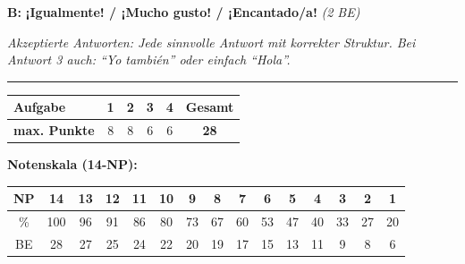 \documentclass[11pt, a4paper]{article}
\newcommand{\lsg}[1]{\textcolor{loesung}{\textbf{#1}}}
\begin{document}
\vspace{0.4em}
\noindent
\textbf{B:} \lsg{¡Igualmente! / ¡Mucho gusto! / ¡Encantado/a!} \hfill \textit{(2 BE)}

\vspace{5pt}
\textit{Akzeptierte Antworten: Jede sinnvolle Antwort mit korrekter Struktur. Bei Antwort 3 auch: ``Yo también'' oder einfach ``Hola''.}


\vspace{20pt}
\hrule
\vspace{10pt}

\noindent
\begin{tabularx}{\textwidth}{|X|c|c|c|c||c|}
\hline
\textbf{Aufgabe} & 1 & 2 & 3 & 4 & \textbf{Gesamt} \\
\hline
\textbf{max. Punkte} & 8 & 8 & 6 & 6 & \textbf{28} \\
\hline
\end{tabularx}

\vspace{15pt}

\noindent\textbf{Notenskala (14-NP):}

\vspace{5pt}

\begin{tabular}{|c|c|c|c|c|c|c|c|c|c|c|c|c|c|c|}
\hline
NP & 14 & 13 & 12 & 11 & 10 & 9 & 8 & 7 & 6 & 5 & 4 & 3 & 2 & 1 \\
\hline
\% & 100 & 96 & 91 & 86 & 80 & 73 & 67 & 60 & 53 & 47 & 40 & 33 & 27 & 20 \\
\hline
BE & 28 & 27 & 25 & 24 & 22 & 20 & 19 & 17 & 15 & 13 & 11 & 9 & 8 & 6 \\
\hline
\end{tabular}
\end{document}
